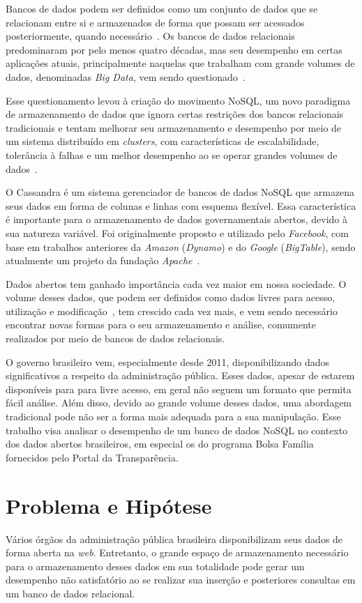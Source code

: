Bancos de dados podem ser definidos como um conjunto de dados que se relacionam entre si e armazenados de forma que possam ser acessados posteriormente, quando necessário~\cite{cjdate}.
Os bancos de dados relacionais predominaram por pelo menos quatro décadas, mas seu desempenho em certas aplicações atuais, principalmente naquelas que trabalham com grande volumes de dados, denominadas \emph{Big Data}, vem sendo questionado~\cite{pramod}. 

Esse questionamento levou à criação do movimento NoSQL, um novo paradigma de armazenamento de dados que ignora certas restrições dos bancos relacionais tradicionais e tentam melhorar seu armazenamento e desempenho por meio de um sistema distribuído em \emph{clusters}, com características de escalabilidade, tolerância à falhas e um melhor desempenho ao se operar grandes volumes de dados~\cite{pramod}.

O Cassandra é um sistema gerenciador de bancos de dados NoSQL que armazena seus dados em forma de colunas e linhas com esquema flexível. Essa característica é importante para o armazenamento de dados governamentais abertos, devido à sua natureza variável. Foi originalmente proposto e utilizado pelo \emph{Facebook}, com base em trabalhos anteriores da \emph{Amazon} (\emph{Dynamo}) e do \emph{Google} (\emph{BigTable}), sendo atualmente um projeto da fundação \emph{Apache}~\cite{cassandraguide}.

Dados abertos tem ganhado importância cada vez maior em nossa sociedade. O volume desses dados, que podem ser definidos como dados livres para acesso, utilização e modificação~\cite{opendefinition}, tem crescido cada vez mais, e vem sendo necessário encontrar novas formas para o seu armazenamento e análise, comumente realizados por meio de bancos de dados relacionais.

O governo brasileiro vem, especialmente desde 2011, disponibilizando dados significativos a respeito da administração pública. Esses dados, apesar de estarem disponíveis para para livre acesso, em geral não seguem um formato que permita fácil análise. Além disso, devido ao grande volume desses dados, uma abordagem tradicional pode não ser a forma mais adequada para a sua manipulação. Esse trabalho visa analisar o desempenho de um banco de dados NoSQL no contexto dos dados abertos brasileiros, em especial os do programa Bolsa Família fornecidos pelo Portal da Transparência.

\section{Problema e Hipótese}
Vários órgãos da administração pública brasileira disponibilizam seus dados de forma aberta na \emph{web}. Entretanto, o grande espaço de armazenamento necessário para o armazenamento desses dados em sua totalidade pode gerar um desempenho não satisfatório ao se realizar sua inserção e posteriores consultas em um banco de dados relacional.

